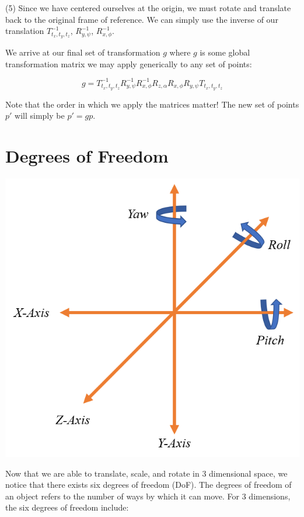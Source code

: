 \documentclass[12pt,letterpaper]{article}
\begin{document}
(5) Since we have centered ourselves at the origin, we must rotate and translate back to the original frame of reference. We can simply use the inverse of our translation $T^{-1}_{t_x, t_y, t_z}$, $R^{-1}_{y, \psi}$, $R^{-1}_{x, \phi}$.

We arrive at our final set of transformation $g$ where $g$ is some global transformation matrix we may apply generically to any set of points:

\begin{equation}
    g = T^{-1}_{t_x, t_y, t_z}
        R^{-1}_{y, \psi}
        R^{-1}_{x, \phi}
        R_{z, \alpha}
        R_{x, \phi}
        R_{y, \psi}
        T_{t_x, t_y, t_z}
\end{equation}

Note that the order in which we apply the matrices matter! The new set of points $p'$ will simply be $p' = gp$.

\section{Degrees of Freedom}
\includegraphics[scale=0.75]{DOF}

Now that we are able to translate, scale, and rotate in 3 dimensional space, we notice that there exists six degrees of freedom (DoF). The degrees of freedom of an object refers to the number of ways by which it can move. For 3 dimensions, the six degrees of freedom include:
\end{document}
